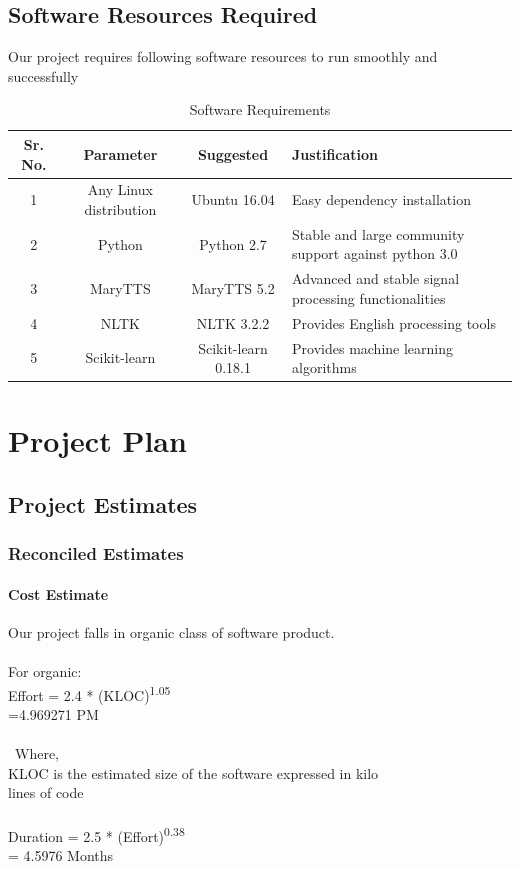 \documentclass[oneside,a4paper,12pt]{book}
\begin{document}
\section{Software Resources Required}
Our project requires following software resources to run smoothly and successfully
\begin{table}[!htbp]
	\begin{center}
		\def\arraystretch{1.5}
		\begin{tabularx}{\textwidth}{| c | c | c | X |}
			\hline
			Sr. No. &	Parameter &	Suggested & Justification \\
			\hline
			1 &	Any Linux distribution &	 Ubuntu 16.04  & Easy dependency installation\\
			\hline
			2 &	Python  &	Python 2.7 & Stable and large community support against python 3.0\\
			\hline
			3 & MaryTTS & MaryTTS 5.2 & Advanced and stable signal processing functionalities\\
			\hline
			4 & NLTK & NLTK 3.2.2 & Provides English processing tools\\
			\hline
			5 & Scikit-learn & Scikit-learn 0.18.1 & Provides machine learning algorithms\\
			\hline
		\end{tabularx}
		\caption { Software Requirements }
		\label{tab:sreq}
	\end{center}
	
\end{table}




\chapter{Project Plan}

\section{Project Estimates}
\subsection{Reconciled Estimates}
\subsubsection{Cost Estimate}
Our project falls in organic class of software product.\\\\
For organic:\\
Effort = 2.4  * (KLOC)\textsuperscript{1.05}\\
\hspace*{12mm}=4.969271  PM\\\\\
Where,\\
KLOC is the estimated size of the software expressed in kilo\\ lines of code\\\\
Duration = 2.5 * (Effort)\textsuperscript{0.38}\\
\hspace*{18mm}= 4.5976  Months
\end{document}
